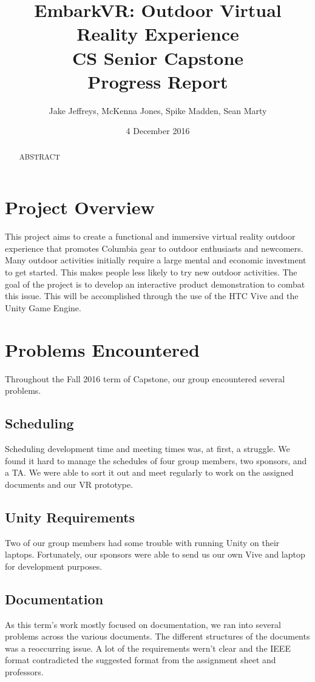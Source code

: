 \documentclass[10pt,journal,compsoc,onecolumn, draftclsnofoot]{IEEEtran}
\title{
EmbarkVR: Outdoor Virtual Reality Experience \\
CS Senior Capstone \\
Progress Report\\
\vspace{1mm}
}
\author{Jake Jeffreys, McKenna Jones, Spike Madden, Sean Marty}
\date{4 December 2016}
\begin{document}
\begin{titlepage}
\maketitle
\vspace{1mm}
\begin{abstract}
ABSTRACT
\end{abstract}
\vspace{1cm}
\end{titlepage}
\tableofcontents
\clearpage

\section{Project Overview}
This project aims to create a functional and immersive virtual reality outdoor experience that promotes Columbia gear to outdoor enthusiasts and newcomers.
Many outdoor activities initially require a large mental and economic
investment to get started.
This makes people less likely to try new outdoor activities.
The goal of the project is to develop an interactive product demonstration to combat this issue.
This will be accomplished through the use of the HTC Vive and the Unity Game Engine.


\section{Problems Encountered}
Throughout the Fall 2016 term of Capstone, our group encountered several problems.
\subsection{Scheduling}
Scheduling development time and meeting times was, at first, a struggle.
We found it hard to manage the schedules of four group members, two sponsors, and a TA.
We were able to sort it out and meet regularly to work on the assigned documents and our VR prototype.
\subsection{Unity Requirements}
Two of our group members had some trouble with running Unity on their laptops.
Fortunately, our sponsors were able to send us our own Vive and laptop for development purposes.
\subsection{Documentation}
As this term's work mostly focused on documentation, we ran into several problems across the various documents.
The different structures of the documents was a reoccurring issue.
A lot of the requirements wern't clear and the IEEE format contradicted the suggested format from the assignment sheet and professors.
\end{document}
